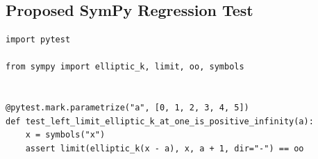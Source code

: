 \documentclass[11pt]{article}
\begin{document}
\subsection{Proposed SymPy Regression Test}

\medskip

\begin{lstlisting}[style=bugpython]
import pytest

from sympy import elliptic_k, limit, oo, symbols


@pytest.mark.parametrize("a", [0, 1, 2, 3, 4, 5])
def test_left_limit_elliptic_k_at_one_is_positive_infinity(a):
    x = symbols("x")
    assert limit(elliptic_k(x - a), x, a + 1, dir="-") == oo
\end{lstlisting}
\end{document}
